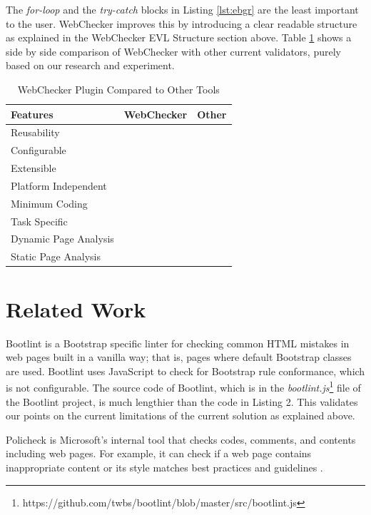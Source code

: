 \documentclass[conference]{IEEETran}
\begin{document}
The \textit{for-loop} and the \textit{try-catch} blocks in Listing \ref{lst:ebgr} are the least important to the user. WebChecker improves this by introducing a clear readable structure as explained in the WebChecker EVL Structure section above. Table \ref{table:compareWebChecker} shows a side by side comparison of WebChecker with other current validators, purely based on our research and experiment.    
 
\begin{table}[H]
\centering
\begin{tabular}{|l|c|c|}
\hline
\textbf{Features}   	 & \textbf{WebChecker} 	& \textbf{Other} \\ \hline
Reusability 	 & \checkmark   	&       \\ \hline
Configurable      & \checkmark        			&       \\ \hline
Extensible        &    \checkmark        			&       \\ \hline
Platform Independent        &    \checkmark        			&       \\ \hline
Minimum Coding        &    \checkmark        			&       \\ \hline	
Task Specific       &    \checkmark        			&       \\ \hline
Dynamic Page Analysis       &    \checkmark        			&       \\ \hline
Static Page Analysis       &    \checkmark        			& \checkmark      \\ \hline	
\end{tabular}
\caption{WebChecker Plugin Compared to Other Tools}
\label{table:compareWebChecker}
\end{table}


\section{Related Work}
Bootlint \cite{bootlint} is a Bootstrap specific linter for checking common HTML mistakes in web pages built in a vanilla way; that is, pages where default Bootstrap classes are used. Bootlint uses JavaScript to check for Bootstrap rule conformance, which is not configurable. The source code of Bootlint, which is in the \textit{bootlint.js}\footnote{https://github.com/twbs/bootlint/blob/master/src/bootlint.js} file of the Bootlint project, is much lengthier than the code in Listing 2. This validates our points on the current limitations of the current solution as explained above. 

Policheck is Microsoft's internal tool that checks codes, comments, and contents including web pages. For example, it can check if a web page contains inappropriate content or its style matches best practices and guidelines \cite{christakis16}.
\end{document}

